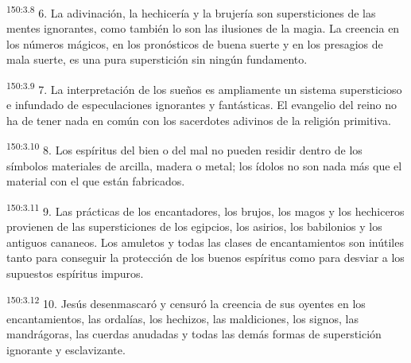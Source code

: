 \par 
\textsuperscript{150:3.8} 6. La adivinación, la hechicería y la brujería son supersticiones de las mentes ignorantes, como también lo son las ilusiones de la magia. La creencia en los números mágicos, en los pronósticos de buena suerte y en los presagios de mala suerte, es una pura superstición sin ningún fundamento.

\par 
\textsuperscript{150:3.9} 7. La interpretación de los sueños es ampliamente un sistema supersticioso e infundado de especulaciones ignorantes y fantásticas. El evangelio del reino no ha de tener nada en común con los sacerdotes adivinos de la religión primitiva.

\par 
\textsuperscript{150:3.10} 8. Los espíritus del bien o del mal no pueden residir dentro de los símbolos materiales de arcilla, madera o metal; los ídolos no son nada más que el material con el que están fabricados.

\par 
\textsuperscript{150:3.11} 9. Las prácticas de los encantadores, los brujos, los magos y los hechiceros provienen de las supersticiones de los egipcios, los asirios, los babilonios y los antiguos cananeos. Los amuletos y todas las clases de encantamientos son inútiles tanto para conseguir la protección de los buenos espíritus como para desviar a los supuestos espíritus impuros.

\par 
\textsuperscript{150:3.12} 10. Jesús desenmascaró y censuró la creencia de sus oyentes en los encantamientos, las ordalías, los hechizos, las maldiciones, los signos, las mandrágoras, las cuerdas anudadas y todas las demás formas de superstición ignorante y esclavizante.

